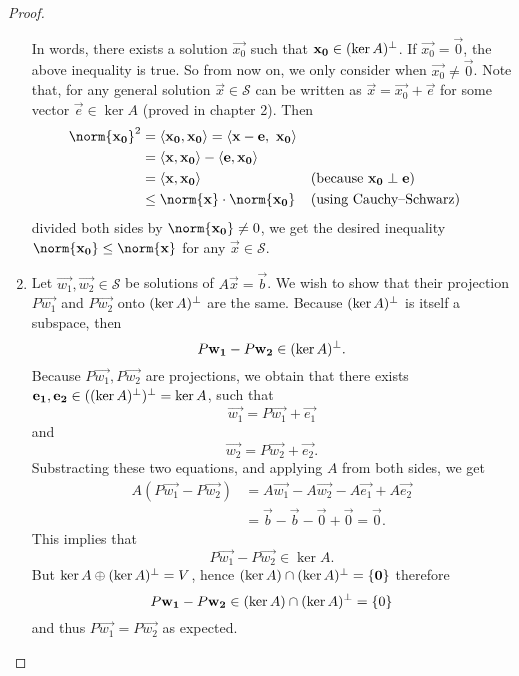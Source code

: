 \begin{proof}
\begin{enumerate}[label={(\alph*)}]
      \hspace{1em}
      In words, there exists a solution $\vec{x_0}$ such that 
      $\mathbf{x_0}\in(\ker A)^\perp$. If $\vec{x_0}=\vec{0}$, 
      the above inequality is true. So from now on, we only 
      consider when $\vec{x_0}\neq \vec{0}$.
      Note that, for any general solution $\vec{x}\in\mathcal S$ 
      can be written as $\vec{x}=\vec{x_0}+\vec{e}$ for some vector 
      $\vec{e}\in\ker A$ (proved in chapter 2). Then
      \begin{align*}
        \norm{\vec{x_0}}^2
        &=\ang{\vec{x_0},\vec{x_0}}
        =\ang{\vec{x}-\vec{e},~ \vec{x_0}}\\
        &=\ang{\vec{x},\vec{x_0}}-\ang{\vec{e},\vec{x_0}}\\
        &=\ang{\vec{x},\vec{x_0}}
        &&\text{(because $\vec{x_0}\perp\vec{e}$)}\\
        &\leq \norm{\vec{x}}\cdot\norm{\vec{x_0}}
        &&\text{(using Cauchy--Schwarz)}
      \end{align*}
      divided both sides by $\norm{\vec{x_0}}\neq 0$, we get the desired 
      inequality $\norm{\vec{x_0}}\leq\norm{\vec{x}}$ for any 
      $\vec{x}\in\mathcal S$.
    \item Let $\vec{w_1}, \vec{w_2}\in\mathcal S$ be solutions of 
      $A\vec{x}=\vec{b}$. We wish to show that their projection 
      $P\vec{w_1}$ and $P\vec{w_2}$ onto $(\ker A)^\perp$ are the same.
      Because $(\ker A)^\perp$ is itself a subspace, then 
      \begin{equation}
        P\mathbf{w_1}-P\mathbf{w_2}\in(\ker A)^\perp.
      \end{equation}
      Because $P\vec{w_1},P\vec{w_2}$ are projections, we obtain that 
      there exists $\mathbf{e_1},\mathbf{e_2}\in((\ker A)^\perp)^\perp=\ker A$,
      such that
      \[ \vec{w_1}=P\vec{w_1}+\vec{e_1} \] and
      \[ \vec{w_2}=P\vec{w_2}+\vec{e_2}. \]
      Substracting these two equations, and applying $A$ from both sides,
      we get
      \begin{align*}
        A(P\vec{w_1}-P\vec{w_2})
        &= A\vec{w_1}-A\vec{w_2}-A\vec{e_1}+A\vec{e_2}\\
        &= \vec{b}-\vec{b}-\vec{0}+\vec{0}=\vec{0}.
      \end{align*}
      This implies that 
      \begin{equation}
        P\vec{w_1}-P\vec{w_2}\in \ker A.
      \end{equation}
      But $\ker A \oplus(\ker A)^\perp=V$, hence 
      $(\ker A)\cap(\ker A)^\perp=\{\mathbf{0}\}$ therefore
      \[ P\mathbf{w_1}-P\mathbf{w_2}\in(\ker A)\cap(\ker A)^\perp=\{0\} \]
      and thus $P\vec{w_1}=P\vec{w_2}$ as expected.
  \end{enumerate}
\end{proof}






